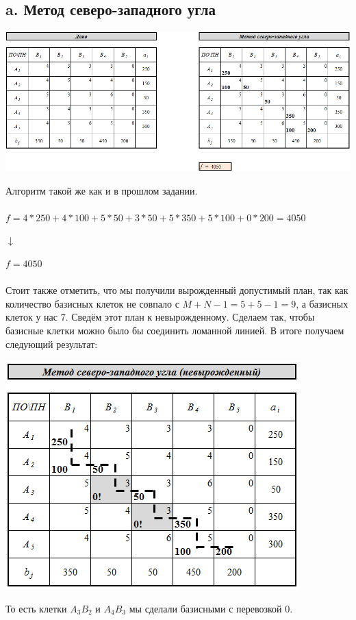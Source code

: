 \documentclass[14pt,a4paper,fleqn]{extarticle}
\begin{document}
\subsection*{a. Метод северо-западного угла}
\begin{center}
	\includegraphics[scale=0.51]{21}
\end{center}
Алгоритм такой же как и в прошлом задании.\\\\
\small $f = 4*250+4*100+5*50+3*50+5*350+5*100+0*200 = 4050$
\begin{center}
	$\downarrow$
\end{center}
$f = 4050$\\\\
Стоит также отметить, что мы получили вырожденный допустимый план, так как количество базисных клеток не совпало с $M+N-1 = 5+5-1 = 9$, а базисных клеток у нас 7.
\newpage
Сведём этот план к невырожденному. Сделаем так, чтобы базисные клетки можно было бы соединить ломанной линией. В итоге получаем следующий результат:\\
\begin{center}
	\includegraphics[scale=0.6]{22}
\end{center}
То есть клетки $A_3B_2$ и $A_4B_3$ мы сделали базисными с перевозкой 0.
\newpage
\end{document}
